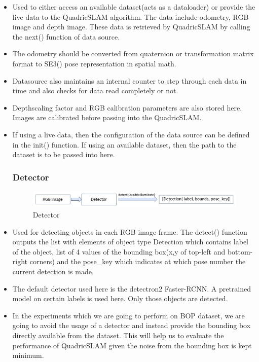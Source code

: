 \documentclass[report.tex]{subfiles}
\begin{document}
\begin{itemize}
\item Used to either access an available dataset(acts as a dataloader) or provide the live data to the QuadricSLAM algorithm. The data include odometry, RGB image and depth image. These data is retrieved by QuadricSLAM by calling the next() function of data source.
\item The odometry should be converted from quaternion or transformation matrix format to SE3() pose representation in spatial math.
\item Datasource also maintains an internal counter to step through each data in time and also checks for data read completely or not.
\item Depthscaling factor and RGB calibration parameters are also stored here. Images are calibrated before passing into the QuadricSLAM.
\item If using a live data, then the configuration of the data source can be defined in the init() function. If using an available dataset, then the path to the dataset is to be passed into here.

\subsubsection{Detector}
\begin{figure}[H]
\centering
\includegraphics[width=\textwidth] {Images/Detector.jpeg}
\caption{\centering Detector}
\label{fig:detector}
\end{figure}

\item Used for detecting objects in each RGB image frame. The detect() function outputs the list with elements of object type Detection which contains label of the object, list of 4 values of the bounding box(x,y of top-left and bottom-right corners) and the pose\_key which indicates at which pose number the current detection is made.
\item The default detector used here is the detectron2 Faster-RCNN. A pretrained model on certain labels is used here. Only those objects are detected.
\item In the experiments which we are going to perform on BOP dataset, we are going to avoid the usage of a detector and instead provide the bounding box directly available from the dataset. This will help us to evaluate the performance of QuadricSLAM given the noise from the bounding box is kept minimum.


\end{itemize}
\end{document}
